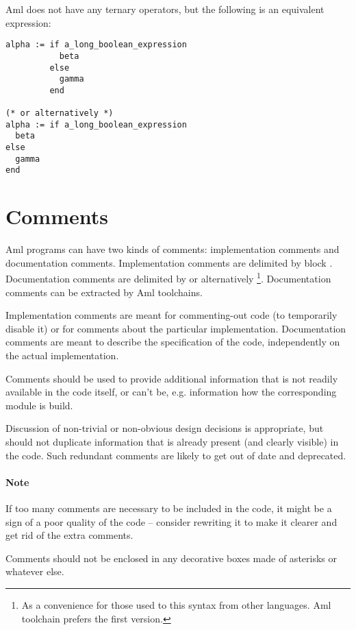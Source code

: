 \example Aml does not have any ternary operators, but the following is an equivalent expression:

\begin{lstlisting}
alpha := if a_long_boolean_expression
           beta
         else
           gamma
         end

(* or alternatively *)
alpha := if a_long_boolean_expression
  beta
else
  gamma
end
\end{lstlisting}





\section{Comments}

Aml programs can have two kinds of comments: implementation comments and documentation comments. Implementation comments are delimited by block \code{(* $\ \ldots$ *)}. Documentation comments are delimited by \code{(*! $\ \ldots$ *)} or alternatively \code{(** $\ \ldots$ *)}\footnote{As a convenience for those used to this syntax from other languages. Aml toolchain prefers the first version.}. Documentation comments can be extracted by Aml toolchains.

Implementation comments are meant for commenting-out code (to temporarily disable it) or for comments about the particular implementation. Documentation comments are meant to describe the specification of the code, independently on the actual implementation. 

Comments should be used to provide additional information that is not readily available in the code itself, or can't be, e.g. information how the corresponding module is build. 

Discussion of non-trivial or non-obvious design decisions is appropriate, but should not duplicate information that is already present (and clearly visible) in the code. Such redundant comments are likely to get out of date and deprecated. 

\paragraph{Note}
If too many comments are necessary to be included in the code, it might be a sign of a poor quality of the code -- consider rewriting it to make it clearer and get rid of the extra comments. 

Comments should not be enclosed in any decorative boxes made of asterisks or whatever else. 





